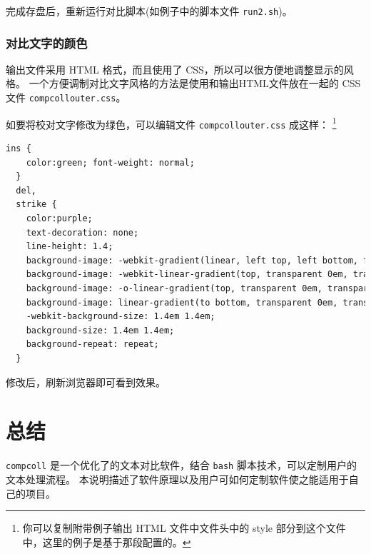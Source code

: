 \documentclass{article}
\begin{document}
完成存盘后，重新运行对比脚本(如例子中的脚本文件 \texttt{run2.sh})。



\subsubsection{对比文字的颜色}

输出文件采用 HTML 格式，而且使用了 CSS，所以可以很方便地调整显示的风格。
一个方便调制对比文字风格的方法是使用和输出HTML文件放在一起的 CSS 文件 \texttt{compcollouter.css}。

如要将校对文字修改为绿色，可以编辑文件 \texttt{compcollouter.css} 成这样：
\footnote{你可以复制附带例子输出 HTML 文件中文件头中的 style 部分到这个文件中，这里的例子是基于那段配置的。}
\begin{lstlisting}[language=html]
  ins {
    color:green; font-weight: normal;
  }
  del,
  strike {
    color:purple;
    text-decoration: none;
    line-height: 1.4;
    background-image: -webkit-gradient(linear, left top, left bottom, from(transparent), color-stop(0.63em, transparent), color-stop(0.63em, #ff0000), color-stop(0.7em, #ff0000), color-stop(0.7em, transparent), to(transparent));
    background-image: -webkit-linear-gradient(top, transparent 0em, transparent 0.63em, #ff0000 0.63em, #ff0000 0.7em, transparent 0.7em, transparent 1.4em);
    background-image: -o-linear-gradient(top, transparent 0em, transparent 0.63em, #ff0000 0.63em, #ff0000 0.7em, transparent 0.7em, transparent 1.4em);
    background-image: linear-gradient(to bottom, transparent 0em, transparent 0.63em, #ff0000 0.63em, #ff0000 0.7em, transparent 0.7em, transparent 1.4em);
    -webkit-background-size: 1.4em 1.4em;
    background-size: 1.4em 1.4em;
    background-repeat: repeat;
  }
\end{lstlisting}

修改后，刷新浏览器即可看到效果。


\section{总结}

\texttt{compcoll} 是一个优化了的文本对比软件，结合 \texttt{bash} 脚本技术，可以定制用户的文本处理流程。
本说明描述了软件原理以及用户可如何定制软件使之能适用于自己的项目。
\end{document}
